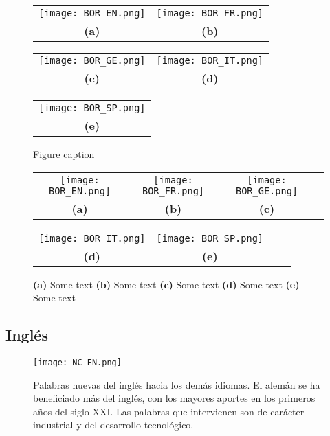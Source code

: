 \begin{figure}
	\centering
	\begin{tabular}{cc}
		\texttt{[image: BOR\_EN.png]} &
		\texttt{[image: BOR\_FR.png]} \\
		\textbf{(a)}  & \textbf{(b)}   \\
	\end{tabular}

	\begin{tabular}{cc}
		\texttt{[image: BOR\_GE.png]} &
		\texttt{[image: BOR\_IT.png]} \\
		\textbf{(c)}  & \textbf{(d)}   \\
	\end{tabular}
	\begin{tabular}{c}
		\texttt{[image: BOR\_SP.png]} \\
		\textbf{(e)} \\
	\end{tabular}
	\caption{Figure caption}
	\label{pics}
\end{figure}


\begin{figure}
	\centering
	\begin{tabular}{cccc}
		\texttt{[image: BOR\_EN.png]} &
		\texttt{[image: BOR\_FR.png]} &
		\texttt{[image: BOR\_GE.png]} \\
		\textbf{(a)}  & \textbf{(b)} & \textbf{(c)}  \\[6pt]
	\end{tabular}
	\begin{tabular}{cccc}
		\texttt{[image: BOR\_IT.png]} &
		\texttt{[image: BOR\_SP.png]} \\
		\textbf{(d)}  & \textbf{(e)}  \\[6pt]
	\end{tabular}
	\caption{ 
		\textbf{(a)} Some text
		\textbf{(b)} Some text
		\textbf{(c)} Some text
		\textbf{(d)} Some text
		\textbf{(e)} Some text}
	\label{fig:Name}
\end{figure}



\subsection{Inglés} %




\begin{figure} %
	\centering
	\texttt{[image: NC\_EN.png]}
	\label{fig.NC_EN}
	\caption{Palabras nuevas del inglés hacia los demás idiomas. El alemán se ha beneficiado más del inglés, con los mayores aportes en los primeros años del siglo XXI. Las palabras que intervienen son de carácter industrial  y del desarrollo tecnológico.}
\end{figure} %

